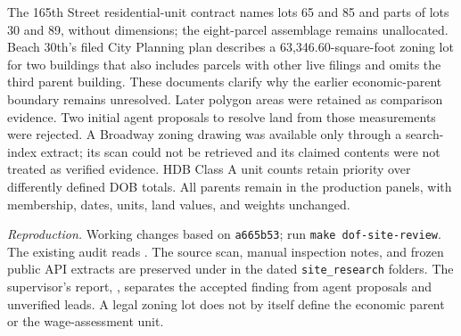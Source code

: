 The 165th Street residential-unit contract names lots 65 and 85 and parts
of lots 30 and 89, without dimensions; the eight-parcel assemblage remains
unallocated. Beach 30th's filed City Planning plan describes a
63,346.60-square-foot zoning lot for two buildings that also includes parcels
with other live filings and omits the third parent building. These documents
clarify why the earlier economic-parent boundary remains unresolved. Later
polygon areas were retained as comparison evidence. Two initial agent proposals to resolve
land from those measurements were rejected. A Broadway zoning drawing was
available only through a search-index extract; its scan could not be retrieved
and its claimed contents were not treated as verified evidence. HDB Class A
unit counts retain priority over differently defined DOB totals. All parents
remain in the production panels, with membership, dates, units, land values,
and weights unchanged.

\textit{Reproduction.} Working changes based on \texttt{a665b53}; run
\texttt{make dof-site-review}. The existing audit reads
. The source scan, manual inspection
notes, and frozen public API extracts are preserved under
 in the dated
\texttt{site\_research} folders. The supervisor's report,
, separates the accepted finding from agent
proposals and unverified leads. A legal zoning lot does not by itself define
the economic parent or the wage-assessment unit.
